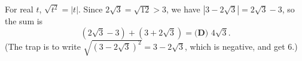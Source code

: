 For real $t$, $\sqrt{t^2}=|t|$. Since $2\sqrt3=\sqrt{12}>3$, we have $\left|3-2\sqrt3\right|=2\sqrt3-3$, so the sum is
\[\left(2\sqrt3-3\right)+\left(3+2\sqrt3\right)=\boxed{\textbf{(D) }4\sqrt3}.\]
(The trap is to write $\sqrt{\left(3-2\sqrt3\right)^2}=3-2\sqrt3$, which is negative, and get $6$.)
